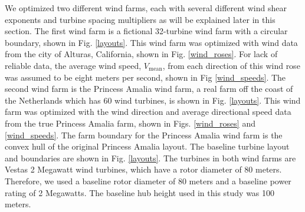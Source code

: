 We optimized two different wind farms, each with several different wind shear exponents and turbine spacing multipliers as will be explained later in this section. 
The first wind farm is a fictional 32-turbine wind farm with a circular boundary, shown in Fig. \ref{layouts}.
This wind farm was optimized with wind data from the city of Alturas, California, shown in Fig. \ref{wind_roses}. For lack of reliable data, the average wind speed, $V_{\text{mean}}$, from each direction of this wind rose was assumed to be eight meters per second, shown in Fig \ref{wind_speeds}.
The second wind farm is the Princess Amalia wind farm, a real farm off the coast of the Netherlands which has 60 wind turbines, is shown in Fig. \ref{layouts}. This wind farm was optimized with the wind direction and average directional speed data from the true Princess Amalia farm, shown in Figs. \ref{wind_roses} and \ref{wind_speeds}. The farm boundary for the Princess Amalia wind farm is the convex hull of the original Princess Amalia layout. The baseline turbine layout and boundaries are shown in Fig. \ref{layouts}. The turbines in both wind farms are Vestas 2 Megawatt wind turbines, which have a rotor diameter of 80 meters. Therefore, we used a baseline rotor diameter of 80 meters and a baseline power rating of 2 Megawatts. The baseline hub height used in this study was 100 meters. 

